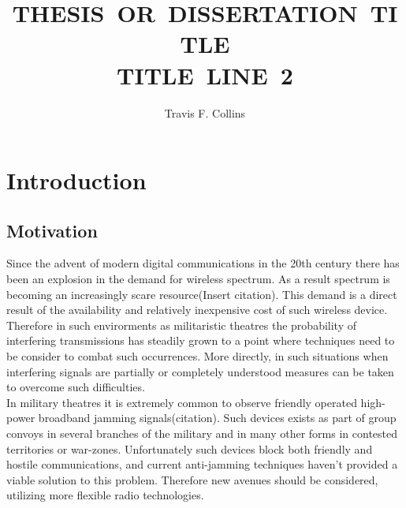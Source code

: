 \documentclass[11pt]{mvlthesis}
\title{\scshape \mbox{THESIS OR DISSERTATION TITLE}\\
\scshape \mbox{TITLE LINE 2}}
\author{Travis F. Collins}
\begin{document}
\maketitle
\begin{abstract}



\end{abstract}


\begin{frontmatter}

\begin{acknowledgements}
\end{acknowledgements}
\tableofcontents
\listoffigures
\listoftables

\end{frontmatter}



\chapter{Introduction}
\label{ch:introduction}
\section{Motivation}

Since the advent of modern digital communications in the 20th century there has been an explosion in the demand for wireless spectrum.  As a result spectrum is becoming an increasingly scare resource(Insert citation).  This demand is a direct result of the availability and relatively inexpensive cost of such wireless device.  Therefore in such envirorments as militaristic theatres the probability of interfering transmissions has steadily grown to a point where techniques need to be consider to combat such occurrences.  More directly, in such situations when interfering signals are partially or completely understood measures can be taken to overcome such difficulties.\\

In military theatres it is extremely common to observe friendly operated high-power broadband jamming signals(citation).  Such devices exists as part of group convoys in several branches of the military and in many other forms in contested territories or war-zones.  Unfortunately such devices block both friendly and hostile communications, and current anti-jamming techniques haven't provided a viable solution to this problem.  Therefore new avenues should be considered, utilizing more flexible radio technologies.\\
\end{document}
